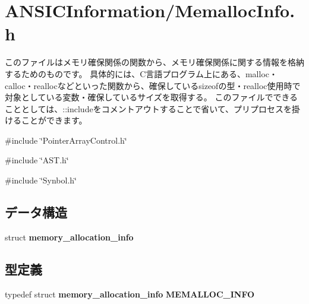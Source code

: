 \section{ANSICInformation/MemallocInfo.h}
\label{_memalloc_info_8h}


このファイルはメモリ確保関係の関数から、メモリ確保関係に関する情報を格納するためのものです。 具体的には、C言語プログラム上にある、malloc・calloc・reallocなどといった関数から、確保しているsizeofの型・realloc使用時で対象としている変数・確保しているサイズを取得する。 このファイルでできることとしては、::includeをコメントアウトすることで省いて、プリプロセスを掛けることができます。  


{\ttfamily \#include \char`\"{}PointerArrayControl.h\char`\"{}}\par
{\ttfamily \#include \char`\"{}AST.h\char`\"{}}\par
{\ttfamily \#include \char`\"{}Synbol.h\char`\"{}}\par
\subsection*{データ構造}
\begin{DoxyCompactItemize}
\item 
struct {\bf memory\_\-allocation\_\-info}
\end{DoxyCompactItemize}
\subsection*{型定義}
\begin{DoxyCompactItemize}
\item 
typedef struct {\bf memory\_\-allocation\_\-info} {\bf MEMALLOC\_\-INFO}
\end{DoxyCompactItemize}
